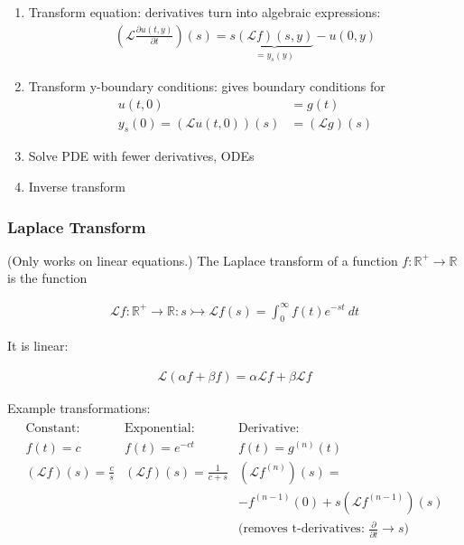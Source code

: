 \label{subsec:transformation}
\begin{enumerate}
    \item{
        Transform equation: derivatives turn into algebraic expressions:
        \begin{align*}
            \left(
            \mathcal{L}\frac{\partial u(t,y)}{\partial t}
            \right)(s) =
            s
            \underbrace{(\mathcal{L}f)(s, y)}_{=y_s(y)}
            -u(0,y)
        \end{align*}
    }
    \item{
        Transform y-boundary conditions: gives boundary conditions for
        \begin{align*}
            u(t,0) & =g(t) \\
            y_s(0)=(\mathcal{L}u(t,0))(s) & = (\mathcal{L}g)(s)
        \end{align*}
    }
    \item Solve PDE with fewer derivatives, ODEs
    \item Inverse transform
\end{enumerate}

\subsubsection{Laplace Transform}

(Only works on linear equations.)
The Laplace transform of a function $f:\mathbb{R}^+\to \mathbb{R}$ is the function

\begin{align*}
    \mathcal{L}f : \mathbb{R}^+\to \mathbb{R} : s \rightarrowtail \mathcal{L}f(s) = \int_0^\infty f(t)e^{-st}\ dt
\end{align*}

It is linear:

\begin{align*}
	\mathcal{L}(\alpha f+\beta f)=\alpha\mathcal{L}f+\beta\mathcal{L}f
\end{align*}

Example transformations:
\begin{align*}
	\begin{matrix}
		\text{Constant: } & \text{Exponential: } & \text{Derivative: } \\
		f(t)=c & f(t)=e^{-ct} & f(t)=g^{(n)}(t) \\
		(\mathcal{L}f)(s) = \frac{c}{s} & (\mathcal{L}f)(s) = \frac{1}{c+s} & (\mathcal{L}f^{(n)})(s)= \\
		& & -f^{(n-1)}(0)+s\left(\mathcal{L}f^{(n-1)}\right)(s) \\
		& & \text{(removes t-derivatives: }\frac{\partial}{\partial t}\rightarrow s\text{)}
	\end{matrix}
\end{align*}

